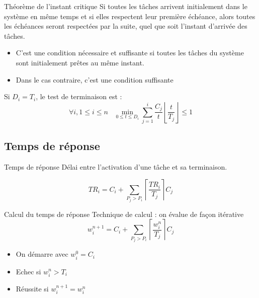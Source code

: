 \begin{frame}{Théorème de l'instant critique}
  Si toutes les  tâches arrivent initialement dans le  système en même
  temps et  si elles respectent  leur première échéance,  alors toutes
  les  échéances  seront  respectées  par  la  suite,  quel  que  soit
  l'instant d'arrivée des tâches.

  \begin{itemize}
  \item  C'est une condition  nécessaire et  suffisante si  toutes les
    tâches du système sont initialement prêtes au même instant.
  \item Dans le cas contraire, c'est une condition suffisante
  \end{itemize}

  Si $D_i = T_i$, le test de terminaison est :
  $$\forall i, 1 ≤ i ≤ n \;\;\;\min_{0 ≤ t ≤ D_i}
  \sum_{j=1}^i\frac{C_j}{t}
  \left\lfloor\frac{t}{T_j}\right\rfloor ≤ 1$$
\end{frame}

\subsection{Temps de réponse}

\begin{frame}{Temps de réponse}
  Délai entre l'activation d'une tâche et sa terminaison. 

  $$TR_i = C_i + \sum_{P_j > P_i} \left\lceil\frac{TR_i}{T_j}\right\rceil C_j$$

\end{frame}

\begin{frame}{Calcul du temps de réponse}
  Technique de calcul : on évalue de façon itérative
  $$w_i^{n+1}=C_i+\sum_{P_j > P_i} \left\lceil\frac{w_i^n}{T_j}\right\rceil C_j$$

  \begin{itemize}
    \item On démarre avec $w_i^0 = C_i$
    \item Echec si $w_i^n > T_i$
    \item Réussite si $w_i^{n+1} = w_i^n$
  \end{itemize}
\end{frame} 

